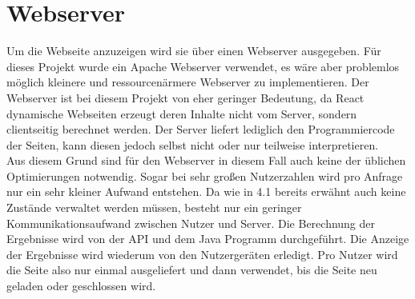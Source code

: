 \section{Webserver}
Um die Webseite anzuzeigen wird sie über einen Webserver ausgegeben. Für dieses Projekt wurde ein Apache Webserver verwendet, es wäre aber problemlos möglich kleinere und ressourcenärmere Webserver zu implementieren. Der Webserver ist bei diesem Projekt von eher geringer Bedeutung, da React dynamische Webseiten erzeugt deren Inhalte nicht vom Server, sondern clientseitig berechnet werden. Der Server liefert lediglich den Programmiercode der Seiten, kann diesen jedoch selbst nicht oder nur teilweise interpretieren. \\
Aus diesem Grund sind für den Webserver in diesem Fall auch keine der üblichen Optimierungen notwendig. Sogar bei sehr großen Nutzerzahlen wird pro Anfrage nur ein sehr kleiner Aufwand entstehen. Da wie in 4.1 bereits erwähnt auch keine Zustände verwaltet werden müssen, besteht nur ein geringer Kommunikationsaufwand zwischen Nutzer und Server. Die Berechnung der Ergebnisse wird von der API und dem Java Programm durchgeführt. Die Anzeige der Ergebnisse wird wiederum von den Nutzergeräten erledigt. Pro Nutzer wird die Seite also nur einmal ausgeliefert und dann verwendet, bis die Seite neu geladen oder geschlossen wird.
\clearpage
